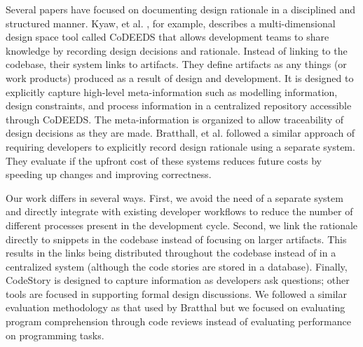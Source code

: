 \documentclass[../manifest.tex]{subfiles}
\begin{document}
Several papers have focused on documenting design rationale in a disciplined and structured manner.  Kyaw, et al. \cite{PK2003}, for example, describes a multi-dimensional design space tool called CoDEEDS that allows development teams to share knowledge by recording design decisions and rationale. Instead of linking to the codebase, their system links to artifacts. They define artifacts as any things (or work products) produced as a result of design and development. It is designed to explicitly capture high-level meta-information such as modelling information, design constraints, and process information in a centralized repository accessible through CoDEEDS. The meta-information is organized to allow traceability of design decisions as they are made. Bratthall, et al. \cite{LB2000} followed a similar approach of requiring developers to explicitly record design rationale using a separate system. They evaluate if the upfront cost of these systems reduces future costs by speeding up changes and improving correctness.

Our work differs in several ways. First, we avoid the need of a separate system and directly integrate with existing developer workflows to reduce the number of different processes present in the development cycle. Second, we link the rationale directly to snippets in the codebase instead of focusing on larger artifacts. This results in the links being distributed throughout the codebase instead of in a centralized system (although the code stories are stored in a database). Finally, CodeStory is designed to capture information as developers ask questions; other tools are focused in supporting formal design discussions. We followed a similar evaluation methodology as that used by Bratthal but we focused on evaluating program comprehension through code reviews instead of evaluating performance on programming tasks.
\end{document}
